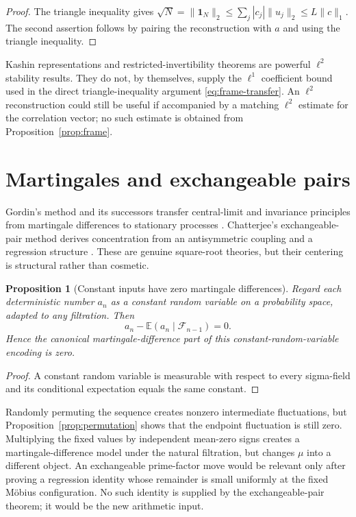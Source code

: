 \documentclass[11pt]{amsart}
\numberwithin{equation}{section}
\theoremstyle{plain}
\newtheorem{proposition}[theorem]{Proposition}
\theoremstyle{definition}
\theoremstyle{remark}
\newcommand{\E}{\mathbb E}
\newcommand{\one}{\mathbf 1}
\begin{document}
\begin{proof}
The triangle inequality gives
\(
 \sqrt N=\|\one_N\|_2\leq\sum_j|c_j|\|u_j\|_2\leq L\|c\|_1.
\)
The second assertion follows by pairing the reconstruction with \(a\) and
using the triangle inequality.
\end{proof}

Kashin representations and restricted-invertibility theorems are powerful
\(\ell^2\) stability results.  They do not, by themselves, supply the
\(\ell^1\) coefficient bound used in the direct triangle-inequality argument
\eqref{eq:frame-transfer}.  An \(\ell^2\) reconstruction could still be useful
if accompanied by a matching \(\ell^2\) estimate for the correlation vector;
no such estimate is obtained from Proposition~\ref{prop:frame}.

\section{Martingales and exchangeable pairs}\label{sec:martingales}

Gordin's method and its successors transfer central-limit and invariance
principles from martingale differences to stationary processes
\cite{Gordin1969,GordinPeligrad2011,PeligradUtev2005}.  Chatterjee's
exchangeable-pair method derives concentration from an antisymmetric coupling
and a regression structure \cite{Chatterjee2007}.  These are genuine
square-root theories, but their centering is structural rather than cosmetic.

\begin{proposition}[Constant inputs have zero martingale differences]
\label{prop:doob}
Regard each deterministic number \(a_n\) as a constant random variable on a
probability space, adapted to any filtration.  Then
\begin{equation}\label{eq:deterministic-doob}
  a_n-\E(a_n\mid\mathcal F_{n-1})=0.
\end{equation}
Hence the canonical martingale-difference part of this constant-random-variable
encoding is zero.
\end{proposition}

\begin{proof}
A constant random variable is measurable with respect to every sigma-field and
its conditional expectation equals the same constant.
\end{proof}

Randomly permuting the sequence creates nonzero intermediate fluctuations, but
Proposition~\ref{prop:permutation} shows that the endpoint fluctuation is still
zero.  Multiplying the fixed values by independent mean-zero signs creates a
martingale-difference model under the natural filtration, but changes \(\mu\)
into a different object.  An exchangeable prime-factor move would be relevant
only after proving a regression identity whose remainder is small uniformly
at the fixed M\"obius configuration.  No such identity is supplied by the
exchangeable-pair theorem; it would be the new arithmetic input.
\end{document}
